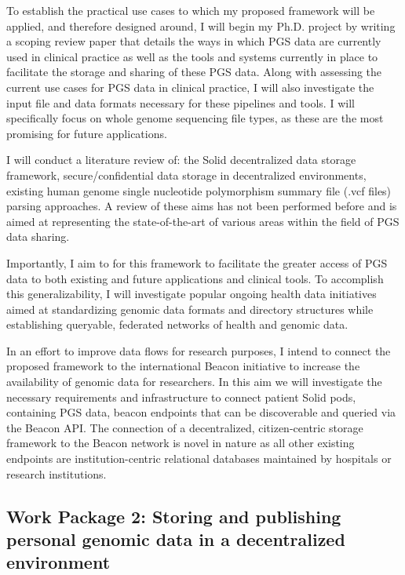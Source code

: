 \documentclass[runningheads]{llncs}
\begin{document}
To establish the practical use cases to which my proposed framework will be applied, and therefore designed around, I will begin my Ph.D. project by writing a scoping review paper that details the ways in which PGS data are currently used in clinical practice as well as the tools and systems currently in place to facilitate the storage and sharing of these PGS data. 
Along with assessing the current use cases for PGS data in clinical practice, I will also investigate the input file and data formats necessary for these pipelines and tools. 
I will specifically focus on whole genome sequencing file types, as these are the most promising for future applications. 

I will conduct a literature review of: the Solid decentralized data storage framework, secure/confidential data storage in decentralized environments, existing human genome single nucleotide polymorphism summary file (.vcf files) parsing approaches. A review of these aims has not been performed before and is aimed at representing the state-of-the-art of various areas within the field of PGS data sharing.

Importantly, I aim to for this framework to facilitate the greater access of PGS data to both existing and future applications and clinical tools. 
To accomplish this generalizability, I will investigate popular ongoing health data initiatives aimed at standardizing genomic data formats and directory structures while establishing queryable, federated networks of health and genomic data.

In an effort to improve data flows for research purposes, I intend to connect the proposed framework to the international Beacon initiative \cite{rambla_beacon_2022} to increase the availability of genomic data for researchers. 
In this aim we will investigate the necessary requirements and infrastructure to connect patient Solid pods, containing PGS data, beacon endpoints that can be discoverable and queried via the Beacon API. The connection of a decentralized, citizen-centric storage framework to the Beacon network is novel in nature as all other existing endpoints are institution-centric relational databases maintained by hospitals or research institutions.


\subsection{Work Package 2: Storing and publishing personal genomic data in a decentralized environment} 
\end{document}
